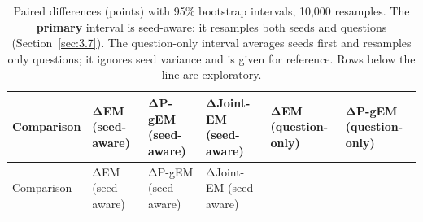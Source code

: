 \begin{longtable}[]{@{}
  >{\raggedright\arraybackslash}p{}
  >{\raggedright\arraybackslash}p{}
  >{\raggedright\arraybackslash}p{}
  >{\raggedright\arraybackslash}p{}
  >{\raggedright\arraybackslash}p{}
  >{\raggedright\arraybackslash}p{}@{}}
\caption{Paired differences (points) with 95\% bootstrap intervals,
10,000 resamples. The \textbf{primary} interval is seed-aware: it
resamples both seeds and questions (Section~\ref{sec:3.7}). The
question-only interval averages seeds first and resamples only
questions; it ignores seed variance and is given for reference. Rows
below the line are exploratory.}\label{tbl:4.3}\tabularnewline
\toprule\noalign{}
\begin{minipage}[b]{\linewidth}\raggedright
Comparison
\end{minipage} & \begin{minipage}[b]{\linewidth}\raggedright
ΔEM (seed-aware)
\end{minipage} & \begin{minipage}[b]{\linewidth}\raggedright
ΔP-gEM (seed-aware)
\end{minipage} & \begin{minipage}[b]{\linewidth}\raggedright
ΔJoint-EM (seed-aware)
\end{minipage} & \begin{minipage}[b]{\linewidth}\raggedright
ΔEM (question-only)
\end{minipage} & \begin{minipage}[b]{\linewidth}\raggedright
ΔP-gEM (question-only)
\end{minipage} \\
\midrule\noalign{}
\endfirsthead
\toprule\noalign{}
\begin{minipage}[b]{\linewidth}\raggedright
Comparison
\end{minipage} & \begin{minipage}[b]{\linewidth}\raggedright
ΔEM (seed-aware)
\end{minipage} & \begin{minipage}[b]{\linewidth}\raggedright
ΔP-gEM (seed-aware)
\end{minipage} & \begin{minipage}[b]{\linewidth}\raggedright
ΔJoint-EM (seed-aware)
\end{minipage} & \begin{minipage}[b]{\linewidth}\raggedright

\end{minipage}
\end{longtable}
